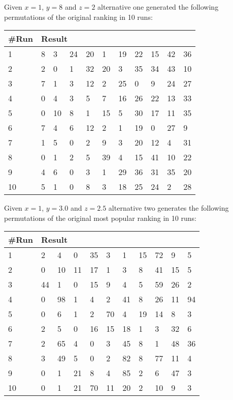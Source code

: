 Given $x=1$, $y=8$ and $z=2$ alternative one generated the following permutations of the original ranking in 10 runs:

\begin{table}[H]
	\centering
	\begin{tabular}{*{11}l}
	\toprule
	\multicolumn{1}{l}{\#Run} & \multicolumn{10}{l}{Result} \\ \midrule
	1 	& 8 & 3 &  24 &  20 &  1 &  19 &  22 &  15 &  42 &  36 \\
	2 	& 2 &  0 &  1 &  32 &  20 &  3 &  35 &  34 &  43 &  10 \\
	3	& 7 &  1 &  3 &  12 &  2 &  25 &  0 &  9 &  24 &  27\\
	4	& 0 &  4 &  3 &  5 &  7 &  16 &  26 &  22 &  13 &  33\\
	5	& 0 &  10 &  8 &  1 &  15 &  5 &  30 &  17 &  11 &  35\\
	6	& 7 &  4 &  6 &  12 &  2 &  1 &  19 &  0 &  27 &  9\\
	7	& 1 &  5 &  0 &  2 &  9 &  3 &  20 &  12 &  4 &  31\\
	8	& 0 &  1 &  2 &  5 &  39 &  4 &  15 &  41 &  10 &  22\\
	9	& 4 &  6 &  0 &  3 &  1 &  29 &  36 &  31 &  35 &  20\\
	10	& 5 &  1 &  0 &  8 &  3 &  18 &  25 & 24 & 2 & 28\\
	\bottomrule
\end{tabular}
\end{table}

Given $x=1$, $y=3.0$ and $z=2.5$ alternative two generates the following permutations of the original most popular ranking in 10 runs:

\begin{table}[H]
	\centering
	\begin{tabular}{*{11}l}
	\toprule
	\multicolumn{1}{l}{\#Run} & \multicolumn{10}{l}{Result} \\ \midrule
	1& 2 &  4 &  0 &  35 &  3 &  1 &  15 &  72 &  9 &  5\\
	2& 0 &  10 &  11 &  17 &  1 &  3 &  8 &  41 &  15 &  5\\
	3 & 44 &  1 &  0 &  15 &  9 &  4 &  5 &  59 &  26 &  2\\
	4& 0 &  98 &  1 &  4 &  2 &  41 &  8 &  26 &  11 &  94\\
	5& 0 &  6 &  1 &  2 &  70 &  4 &  19 &  14 &  8 &  3\\
	6& 2 &  5 &  0 &  16 &  15 &  18 &  1 &  3 &  32 &  6\\
	7& 2 &  65 &  4 &  0 &  3 &  45 &  8 &  1 &  48 &  36\\
	8& 3 &  49 &  5 &  0 &  2 &  82 &  8 &  77 &  11 &  4\\
	9& 0 &  1 &  21 &  8 &  4 &  85 &  2 &  6 &  47 &  3\\
	10& 0 &  1 &  21 &  70 &  11 &  20 &  2 & 10 & 9& 3 \\
	\bottomrule
\end{tabular}
\end{table}

